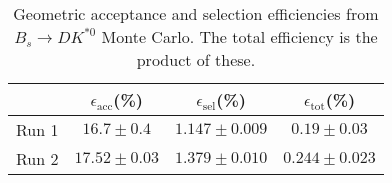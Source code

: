 \begin{table}
    \centering
    \begin{tabular}{cccc}
        \toprule
        & $\epsilon_\mathrm{acc}$(\%) &  $\epsilon_\mathrm{sel}$(\%) &  $\epsilon_\mathrm{tot}$(\%) \\
        \midrule
        Run 1 & $16.7 \pm 0.4$ & $1.147 \pm 0.009$ & $0.19 \pm 0.03$ \\
        Run 2 & $17.52 \pm 0.03$ & $1.379 \pm 0.010$ & $0.244 \pm 0.023$ \\
        \bottomrule
    \end{tabular}
    \caption{Geometric acceptance and selection efficiencies from  $B_s \to DK^{*0}$ Monte Carlo. The total efficiency is the  product of these.}
\label{tab:selection_efficiency_Bs}
\end{table}
